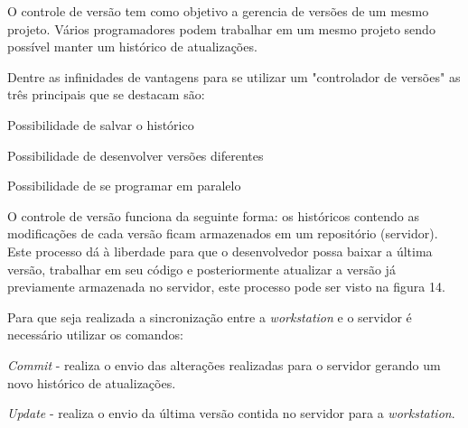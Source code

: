 O controle de versão tem como objetivo a gerencia de versões de um mesmo projeto. Vários programadores podem trabalhar em um mesmo projeto sendo possível manter um histórico de atualizações.

Dentre as infinidades de vantagens para se utilizar um "controlador de versões" as três principais que se destacam são:
\begin{alineascomponto}
	
   \item Possibilidade de salvar o histórico
   \item Possibilidade de desenvolver versões diferentes
   \item Possibilidade de se programar em paralelo

	\end{alineascomponto}
	
	
O controle de versão funciona da seguinte forma: os históricos contendo as modificações de cada versão ficam armazenados em um repositório (servidor). Este processo dá à liberdade para que o desenvolvedor possa baixar a última versão, trabalhar em seu código e posteriormente atualizar a versão já previamente armazenada no servidor, este processo pode ser visto na figura 14.

	\begin{figure}[h!]
		\centering
	\end{figure}
	
	Para que seja realizada a sincronização entre a \textit{workstation} e o servidor é necessário utilizar os comandos:
	
	\begin{alineascomponto}
\item \textit{Commit} - realiza o envio das alterações realizadas para o servidor gerando um novo histórico de atualizações.
\item \textit{Update} - realiza o envio da última versão contida no servidor para a \textit{workstation}.
\cite{cv}
	\end{alineascomponto}
	

